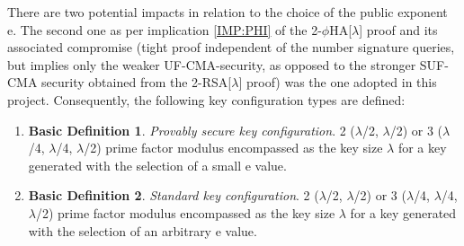 \documentclass[]{final_report}
\theoremstyle{definition}
\newtheorem{basic}{Basic Definition}
\begin{document}
\label{notionProv}

There are two potential impacts in relation to the choice of the public exponent e. The second one as per implication \ref{IMP:PHI} of the 2-\(\phi\)HA[\(\lambda\)] proof and its associated compromise (tight proof independent of the number signature queries, but implies only the weaker UF-CMA-security, as opposed to the stronger SUF-CMA security obtained from the 2-RSA[\(\lambda\)] proof) was the one adopted in this project. Consequently, the following key configuration types are defined:

\begin{enumerate}
    \item[] \begin{basic}  \label{PROVKEY}
\textit{Provably secure key configuration}. 2 ($\lambda$/2, $\lambda$/2) or 3 ($\lambda$/4, $\lambda$/4, $\lambda$/2) prime factor modulus encompassed as the key size $\lambda$ for a key generated with the selection of a small e value.
\end{basic}
    \item[] \begin{basic}
\textit{Standard key configuration}. 2 ($\lambda$/2, $\lambda$/2) or 3 ($\lambda$/4, $\lambda$/4, $\lambda$/2) prime factor modulus encompassed as the key size $\lambda$ for a key generated with the selection of an arbitrary e value.
\end{basic}

\end{enumerate}
\end{document}
